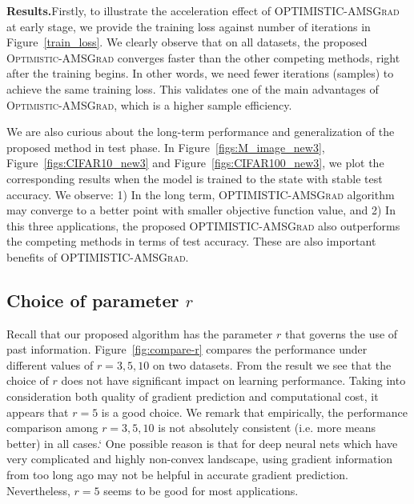 \documentclass[11pt]{article}
\theoremstyle{k}
\begin{document}
\textbf{Results.}\hspace{0.1in}Firstly, to illustrate the acceleration effect of \textsc{OPTIMISTIC-AMSGrad} at early stage, we provide the training loss against number of iterations in Figure~\ref{train_loss}. We clearly observe that on all datasets, the proposed \textsc{Optimistic-AMSGrad} converges faster than the other competing methods, right after the training begins. In other words, we need fewer iterations (samples) to achieve the same training loss. This validates one of the main advantages of \textsc{Optimistic-AMSGrad}, which is a higher sample efficiency.

We are also curious about the long-term performance and generalization of the proposed method in test phase. In Figure~\ref{figs:M_image_new3}, Figure~\ref{figs:CIFAR10_new3} and Figure~\ref{figs:CIFAR100_new3}, we plot the corresponding results when the model is trained to the state with stable test accuracy. We observe: 1) In the long term, \textsc{OPTIMISTIC-AMSGrad} algorithm may converge to a better point with smaller objective function value, and 2) In this three applications, the proposed \textsc{OPTIMISTIC-AMSGrad} also outperforms the competing methods in terms of test accuracy. These are also important benefits of \textsc{OPTIMISTIC-AMSGrad}.


\subsection{Choice of parameter $r$}
Recall that our proposed algorithm has the parameter $r$ that governs the use of past information.
Figure~\ref{fig:compare-r} compares the performance under different values of $r=3,5,10$ on two datasets. 
From the result we see that the choice of $r$ does not have significant impact on learning performance. Taking into consideration both quality of gradient prediction and computational cost, it appears that $r=5$ is a good choice. 
We remark that empirically, the performance comparison among $r=3,5,10$ is not absolutely consistent (i.e. more means better) in all cases.`
One possible reason is that for deep neural nets which have very complicated and highly non-convex landscape, using gradient information from too long ago may not be helpful in accurate gradient prediction. Nevertheless, $r=5$ seems to be good for most applications.
\end{document}
